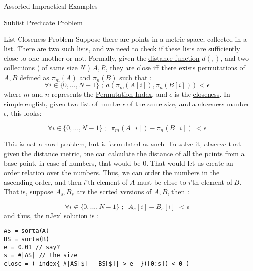 \begin{section}{Assorted Impractical Examples}
\begin{subsection}{Sublist Predicate Problem}
\end{subsection}

\begin{subsection}{List Closeness Problem}
Suppose there are points in a \href{https://en.wikipedia.org/wiki/Metric\_space}{metric space},
collected in a list. There are two such lists, and we need to check if these lists are sufficiently close to 
one another or not. Formally, given the \href{https://en.wikipedia.org/wiki/Distance\#General\_metric}{distance function} $d(,)$,
and two collections ( of same size $N$ ) $A,B$, they are close iff there exists permutations of $A,B$ defined as $\pi_m(A)$ and $\pi_n(B)$
such that :
$$
\forall i \in \{ 0 , ... , N - 1 \} \; ; \; d( \pi_m(A[i]) , \pi_n(B[i]) ) < \epsilon  
$$   
where $m$ and $n$ represents the \href{http://mathworld.wolfram.com/PermutationIndex.html}{Permutation Index},
and $\epsilon$ is the \href{https://en.wikipedia.org/wiki/Closeness\_(mathematics)}{closeness}.
In simple english, given two list of numbers of the same size, and a closeness number $\epsilon$, this looks:
  
$$
\forall i \in \{ 0 , ... , N - 1 \} \; ; \;  |\pi_m(A[i]) - \pi_n(B[i]) | < \epsilon  
$$   

This is not a hard problem, but is formulated as such. To solve it, observe that given the distance metric, 
one can calculate the distance of all the points from a base point, in case of numbers, that would be 0. 
That would let us create an \href{https://en.wikipedia.org/wiki/Total\_order}{order relation} over the numbers.
Thus, we can order the numbers in the ascending order, and then $i$'th element of $A$ must be close to $i$'th element of $B$.
That is, suppose $A_s,B_s$ are the sorted versions of $A,B$, then :

$$
\forall i \in \{ 0 , ... , N - 1 \} \; ; \;  | A_s[i] - B_s[i] | < \epsilon  
$$   
and thus, the nJexl solution is :
 
\begin{center}\begin{minipage}{\linewidth}
\begin{lstlisting}[style=JexlStyle]
AS = sorta(A)
BS = sorta(B)
e = 0.01 // say?
s = #|AS| // the size 
close = ( index{ #|AS[$] - BS[$]| > e  }([0:s]) < 0 )
\end{lstlisting}  
\end{minipage}\end{center}
\end{subsection}


\end{section}
